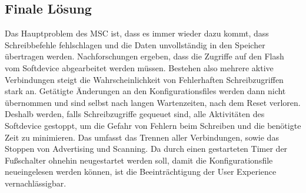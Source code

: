\subsection{Finale Lösung}
Das Hauptproblem des MSC ist, dass es immer wieder dazu kommt, dass Schreibbefehle fehlschlagen und die Daten unvollständig in den Speicher übertragen werden. Nachforschungen ergeben, dass die Zugriffe auf den Flash vom Softdevice abgearbeitet werden müssen. Bestehen also mehrere aktive Verbindungen steigt die Wahrscheinlichkeit von Fehlerhaften Schreibzugriffen stark an. Getätigte Änderungen an den Konfigurationsfiles werden dann nicht übernommen und sind selbst nach langen Wartenzeiten, nach dem Reset verloren. Deshalb werden, falls Schreibzugriffe gequeuet sind, alle Aktivitäten des Softdevice gestoppt, um die Gefahr von Fehlern beim Schreiben und die benötigte Zeit zu minimieren. Das umfasst das Trennen aller Verbindungen, sowie das Stoppen von Advertising und Scanning. Da durch einen gestarteten Timer der Fußschalter ohnehin neugestartet werden soll, damit die Konfigurationsfile neueingelesen werden können, ist die Beeinträchtigung der User Experience vernachlässigbar. 
